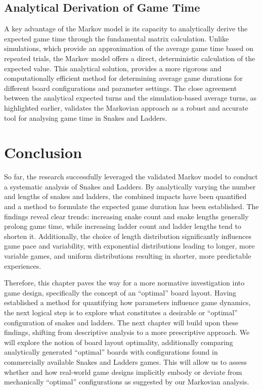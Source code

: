\subsection{Analytical Derivation of Game Time}

A key advantage of the Markov model is its capacity to analytically derive the expected game time through the fundamental matrix calculation. Unlike simulations, which provide an approximation of the average game time based on repeated trials, the Markov model offers a direct, deterministic calculation of the expected value. This analytical solution, provides a more rigorous and computationally efficient method for determining average game durations for different board configurations and parameter settings. The close agreement between the analytical expected turns and the simulation-based average turns, as highlighted earlier, validates the Markovian approach as a robust and accurate tool for analysing game time in Snakes and Ladders.

\section{Conclusion}

So far, the research successfully leveraged the validated Markov model to conduct a systematic analysis of Snakes and Ladders. By analytically varying the number and lengths of snakes and ladders, the combined impacts have been quantified and a method to formulate the expected game duration has been established. The findings reveal clear trends: increasing snake count and snake lengths generally prolong game time, while increasing ladder count and ladder lengths tend to shorten it.  Additionally, the choice of length distribution significantly influences game pace and variability, with exponential distributions leading to longer, more variable games, and uniform distributions resulting in shorter, more predictable experiences.

Therefore, this chapter paves the way for a more normative investigation into game design, specifically the concept of an ``optimal'' board layout. Having established a method for quantifying how parameters influence game dynamics, the next logical step is to explore what constitutes a desirable or ``optimal'' configuration of snakes and ladders. The next chapter will build upon these findings, shifting from descriptive analysis to a more prescriptive approach. We will explore the notion of board layout optimality, additionally comparing analytically generated ``optimal'' boards with configurations found in commercially available Snakes and Ladders games. This will allow us to assess whether and how real-world game designs implicitly embody or deviate from mechanically ``optimal'' configurations as suggested by our Markovian analysis.
